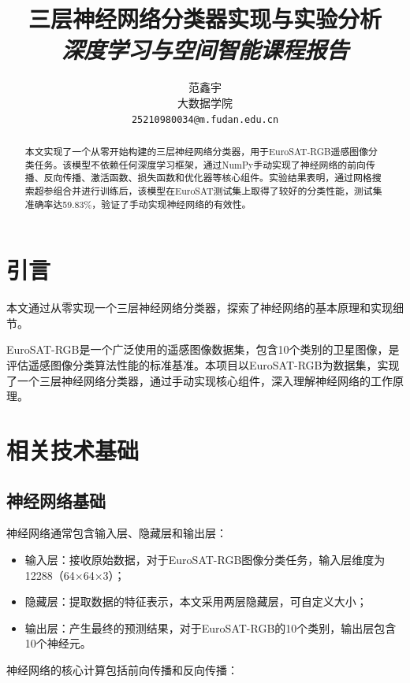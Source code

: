 \documentclass[UTF8]{article}
\title{
    \textbf{三层神经网络分类器实现与实验分析} \\
    \vspace{8pt}
    \large \textit{深度学习与空间智能课程报告}
}
\author{
    {\hspace{1mm}范鑫宇} \\
    大数据学院\\
    \texttt{25210980034@m.fudan.edu.cn} \\
}
\begin{document}
\maketitle

\begin{abstract}
本文实现了一个从零开始构建的三层神经网络分类器，用于EuroSAT-RGB遥感图像分类任务。该模型不依赖任何深度学习框架，通过NumPy手动实现了神经网络的前向传播、反向传播、激活函数、损失函数和优化器等核心组件。实验结果表明，通过网格搜索超参组合并进行训练后，该模型在EuroSAT测试集上取得了较好的分类性能，测试集准确率达59.83\%，验证了手动实现神经网络的有效性。

\end{abstract}

\section{引言}
本文通过从零实现一个三层神经网络分类器，探索了神经网络的基本原理和实现细节。

EuroSAT-RGB是一个广泛使用的遥感图像数据集，包含10个类别的卫星图像，是评估遥感图像分类算法性能的标准基准。本项目以EuroSAT-RGB为数据集，实现了一个三层神经网络分类器，通过手动实现核心组件，深入理解神经网络的工作原理。


\section{相关技术基础}

\subsection{神经网络基础}

神经网络通常包含输入层、隐藏层和输出层：

\begin{itemize}[topsep=0pt, partopsep=0pt, itemsep=0pt, parsep=0pt]
    \item 输入层：接收原始数据，对于EuroSAT-RGB图像分类任务，输入层维度为12288（64×64×3）；
    \item 隐藏层：提取数据的特征表示，本文采用两层隐藏层，可自定义大小；
    \item 输出层：产生最终的预测结果，对于EuroSAT-RGB的10个类别，输出层包含10个神经元。
\end{itemize}

神经网络的核心计算包括前向传播和反向传播：
\end{document}
